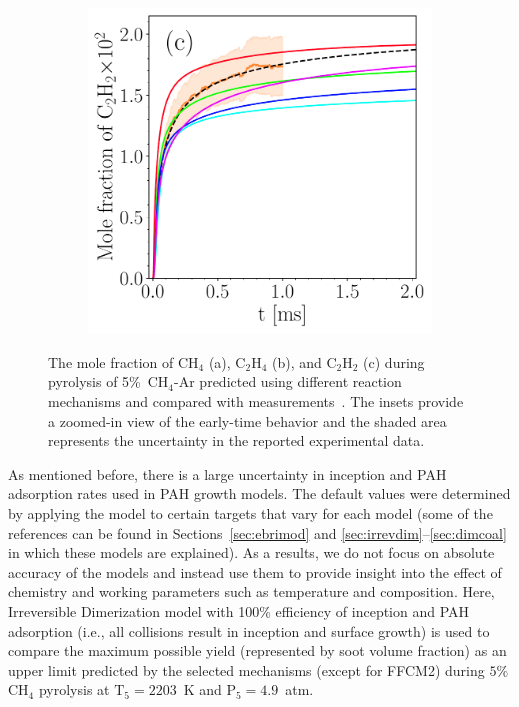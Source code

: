 \begin{figure}[H]
\begin{subfigure}[t]{0.32\textwidth}
	\end{subfigure}
	\begin{subfigure}[t]{0.32\textwidth}
		\includegraphics[width=1\textwidth]{Figures/Results/chemistry/C2H2.pdf}
	\end{subfigure}
	\caption{The mole fraction of $\mathrm{CH_4}$ (a), $\mathrm{C_2H_4}$ (b), and $\mathrm{C_2H_2}$ (c) during pyrolysis of 5\%~$\mathrm{CH_4}$-Ar predicted using different reaction mechanisms and compared with measurements~\citep{clack2025}. The insets provide a zoomed-in view of the early-time behavior and the shaded area represents the uncertainty in the reported experimental data.}
	\label{fig:CH4_C2H2_C2H4_chem} 
\end{figure}

As mentioned before, there is a large uncertainty in inception and PAH adsorption rates used in PAH growth models. The default values were determined by applying the model to certain targets that vary for each model (some of the references can be found in Sections~\ref{sec:ebrimod} and \ref{sec:irrevdim}–\ref{sec:dimcoal} in which these models are explained). As a results, we do not focus on absolute accuracy of the models and instead use them to provide insight into the effect of chemistry and working parameters such as temperature and composition.
Here, Irreversible Dimerization model with 100\% efficiency of inception and PAH adsorption (i.e., all collisions result in inception and surface growth) is used to compare the maximum possible yield (represented by soot volume fraction) as an upper limit predicted by the selected mechanisms (except for FFCM2) during $5\%$ $\mathrm{CH_4}$ pyrolysis at $\mathrm{T_5}=2203$~K and $\mathrm{P_5}=4.9$~atm. 


